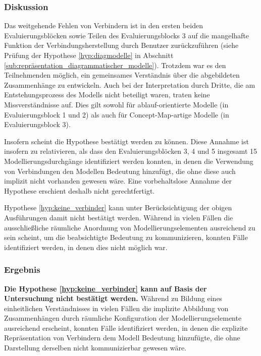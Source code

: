 \subsubsection{Diskussion} %

Das weitgehende Fehlen von Verbindern ist in den ersten beiden Evaluierungsblöcken sowie Teilen des Evaluierungsblocks 3 auf die mangelhafte Funktion der Verbindungsherstellung durch Benutzer zurückzuführen (siehe Prüfung der Hypothese \ref{hyp:diagmodelle} in Abschnitt \ref{sub:repräsentation_diagrammatischer_modelle}). Trotzdem war es den Teilnehmenden möglich, ein gemeinsames Verständnis über die abgebildeten Zusammenhänge zu entwickeln. Auch bei der Interpretation durch Dritte, die am Entstehungsprozess des Modells nicht beteiligt waren, traten keine Missverständnisse auf. Dies gilt sowohl für ablauf-orientierte Modelle (in Evaluierungsblock 1 und 2) als auch für Concept-Map-artige Modelle (in Evaluierungsblock 3).

Insofern scheint die Hypothese bestätigt werden zu können. Diese Annahme ist insofern zu relativieren, als dass den Evaluierungsblöcken 3, 4 und 5 insgesamt 15 Modellierungsdurchgänge identifiziert werden konnten, in denen die Verwendung von Verbindungen den Modellen Bedeutung hinzufügt, die ohne diese auch implizit nicht vorhanden gewesen wäre. Eine vorbehaltslose Annahme der Hypothese erschient deshalb nicht gerechtfertigt.

Hypothese \ref{hyp:keine_verbinder} kann unter Berücksichtigung der obigen Ausführungen damit nicht bestätigt werden. Während in vielen Fällen die ausschließliche räumliche Anordnung von Modellierungselementen ausreichend zu sein scheint, um die beabsichtigte Bedeutung zu kommunizieren, konnten Fälle identifiziert werden, in denen dies nicht möglich war.

\subsubsection{Ergebnis} %

\textbf{Die Hypothese \ref{hyp:keine_verbinder} kann auf Basis der Untersuchung nicht bestätigt werden.} Während zu Bildung eines einheitlichen Verständnisses in vielen Fällen die implizite Abbildung von Zusammenhängen durch räumliche Konfiguration der Modellierungselemente ausreichend erscheint, konnten Fälle identifiziert werden, in denen die explizite Repräsentation von Verbindern dem Modell Bedeutung hinzufügte, die ohne Darstellung derselben nicht kommunizierbar gewesen wäre.

